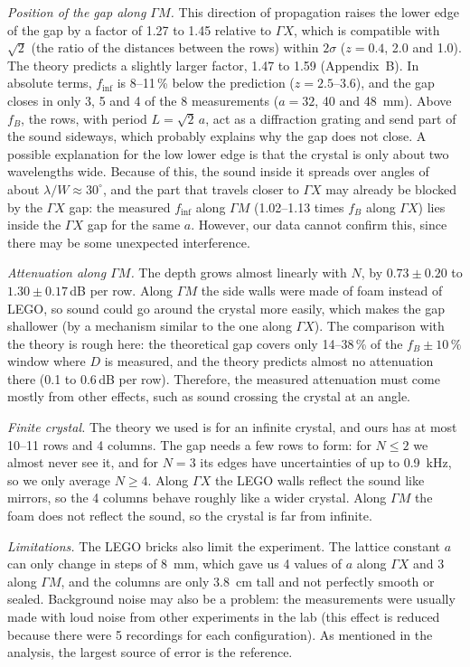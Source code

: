 \documentclass[9pt,a4paper,twocolumn]{extarticle}
\newcommand{\umm}{\milli\metre}
\newcommand{\ucm}{\centi\metre}
\newcommand{\ukHz}{\kilo\hertz}
\newcommand{\GX}{\ensuremath{\Gamma X}}
\newcommand{\GM}{\ensuremath{\Gamma M}}
\newcommand{\finf}{\ensuremath{f_{\mathrm{inf}}}}
\begin{document}
\emph{Position of the gap along \GM.} This direction of propagation raises the lower edge of the gap by a factor of 1.27 to 1.45 relative to \GX, which is compatible with $\sqrt2$ (the ratio of the distances between the rows) within $2\sigma$ ($z=0.4$, 2.0 and 1.0). The theory predicts a slightly larger factor, 1.47 to 1.59 (Appendix~B). In absolute terms, \finf{} is 8--11\,\% below the prediction ($z=2.5$--3.6), and the gap closes in only 3, 5 and 4 of the 8 measurements ($a=32$, 40 and \SI{48}{\umm}). Above $f_B$, the rows, with period $L=\sqrt2\,a$, act as a diffraction grating and send part of the sound sideways, which probably explains why the gap does not close. A possible explanation for the low lower edge is that the crystal is only about two wavelengths wide. Because of this, the sound inside it spreads over angles of about $\lambda/W\approx30^\circ$, and the part that travels closer to \GX{} may already be blocked by the \GX{} gap: the measured \finf{} along \GM{} (1.02--1.13 times $f_B$ along \GX) lies inside the \GX{} gap for the same $a$. However, our data cannot confirm this, since there may be some unexpected interference.

\emph{Attenuation along \GM.} The depth grows almost linearly with $N$, by $0.73\pm0.20$ to $1.30\pm0.17$\,dB per row. Along \GM{} the side walls were made of foam instead of LEGO, so sound could go around the crystal more easily, which makes the gap shallower (by a mechanism similar to the one along \GX). The comparison with the theory is rough here: the theoretical gap covers only 14--38\,\% of the $f_B\pm10\,\%$ window where $D$ is measured, and the theory predicts almost no attenuation there (0.1 to 0.6\,dB per row). Therefore, the measured attenuation must come mostly from other effects, such as sound crossing the crystal at an angle.

\emph{Finite crystal.} The theory we used is for an infinite crystal, and ours has at most 10--11 rows and 4 columns. The gap needs a few rows to form: for $N\le2$ we almost never see it, and for $N=3$ its edges have uncertainties of up to \SI{0.9}{\ukHz}, so we only average $N\ge4$. Along \GX{} the LEGO walls reflect the sound like mirrors, so the 4 columns behave roughly like a wider crystal. Along \GM{} the foam does not reflect the sound, so the crystal is far from infinite.

\emph{Limitations.} The LEGO bricks also limit the experiment. The lattice constant $a$ can only change in steps of \SI{8}{\umm}, which gave us 4 values of $a$ along \GX{} and 3 along \GM, and the columns are only \SI{3.8}{\ucm} tall and not perfectly smooth or sealed. Background noise may also be a problem: the measurements were usually made with loud noise from other experiments in the lab (this effect is reduced because there were 5 recordings for each configuration). As mentioned in the analysis, the largest source of error is the reference.
\end{document}
